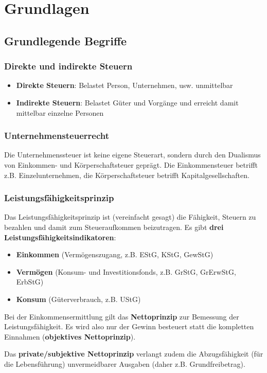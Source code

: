 \documentclass[12pt,A4]{extarticle}
\newcommand{\highlight}[1]{\textcolor{highlightColor}{\textbf{#1}}}
\begin{document}
\disclaimer

\tableofcontents
\clearpage

\section{Grundlagen}
\subsection{Grundlegende Begriffe}
\subsubsection{Direkte und indirekte Steuern}
\begin{itemize}
  \item{\textbf{Direkte Steuern}: Belastet Person, Unternehmen, usw. unmittelbar}
  \item{\textbf{Indirekte Steuern}: Belastet Güter und Vorgänge und erreicht damit mittelbar einzelne Personen}
\end{itemize}

\subsubsection{Unternehmensteuerrecht}
Die Unternehmenssteuer ist keine eigene Steuerart, sondern durch den Dualismus von Einkommen- und Körperschaftsteuer geprägt. Die Einkommensteuer betrifft z.B. Einzelunternehmen, die Körperschaftsteuer betrifft Kapitalgesellschaften.

\subsubsection{Leistungsfähigkeitsprinzip}\label{sec:leistungsfaehigkeitsprinzip}
Das Leistungsfähigkeitsprinzip ist (vereinfacht gesagt) die Fähigkeit, Steuern zu bezahlen und damit zum Steueraufkommen beizutragen. Es gibt \textbf{drei Leistungsfähigkeitsindikatoren}:
\begin{itemize}
  \item{\textbf{Einkommen} (Vermögenszugang, z.B. EStG, KStG, GewStG)}
  \item{\textbf{Vermögen} (Konsum- und Investitionsfonds, z.B. GrStG, GrErwStG, ErbStG)}
  \item{\textbf{Konsum} (Güterverbrauch, z.B. UStG)}
\end{itemize}
Bei der Einkommensermittlung gilt das \textbf{Nettoprinzip} zur Bemessung der Leistungsfähigkeit. Es wird also nur der Gewinn besteuert statt die kompletten Einnahmen (\highlight{objektives Nettoprinzip}).\par
Das \highlight{private/subjektive Nettoprinzip} verlangt zudem die Abzugsfähigkeit (für die Lebensführung) unvermeidbarer Ausgaben (daher z.B. Grundfreibetrag).
\end{document}
